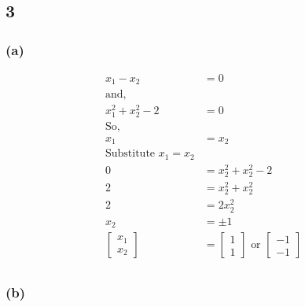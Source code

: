 \documentclass{article}
\begin{document}
\subsection*{3}
\subsubsection*{(a)}

\begin{align*}
    x_1 - x_2 &= 0 \\
    \text{and,}&\\
    x_1^2 + x_2^2 - 2 &=0\\
    \text{So,}&\\
    x_1 &= x_2 \\
    \text{Substitute $x_1 = x_2 $}&\\
    0 &= x_2^2 + x_2^2 - 2\\
    2 &= x_2^2 + x_2^2\\
    2 &= 2x_2^2\\
    x_2 &= \pm 1\\
    \begin{bmatrix} x_1 \\ x_2 \end{bmatrix} &= \begin{bmatrix} 1 \\ 1 \end{bmatrix} \text{ or } \begin{bmatrix} -1 \\ -1 \end{bmatrix}\\
\end{align*}

\subsubsection*{(b)}
\end{document}
